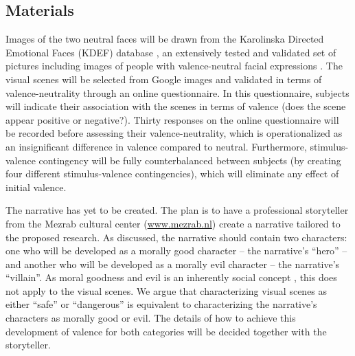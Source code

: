 \documentclass[12pt,a4paper]{article}\usepackage[]{graphicx}\usepackage[]{color}
\begin{document}
\subsection{Materials}
Images of the two neutral faces will be drawn from the Karolinska Directed Emotional Faces (KDEF) database \citep{KDEF}, an extensively tested and validated set of pictures including images of people with valence-neutral facial expressions \citep{goeleven2008}. The visual scenes will be selected from Google images and validated in terms of valence-neutrality through an online questionnaire. In this questionnaire, subjects will indicate their association with the scenes in terms of valence (does the scene appear positive or negative?). Thirty responses on the online questionnaire will be recorded before assessing their valence-neutrality, which is operationalized as an insignificant difference in valence compared to neutral. Furthermore, stimulus-valence contingency will be fully counterbalanced between subjects (by creating four different stimulus-valence contingencies), which will eliminate any effect of initial valence.

The narrative has yet to be created. The plan is to have a professional storyteller from the Mezrab cultural center (\url{www.mezrab.nl}) create a narrative tailored to the proposed research. As discussed, the narrative should contain two characters: one who will be developed as a morally good character -- the narrative's ``hero'' -- and another who will be developed as a morally evil character -- the narrative's ``villain''. As moral goodness and evil is an inherently social concept \citep{greene2002}, this does not apply to the visual scenes. We argue that characterizing visual scenes as either ``safe'' or ``dangerous'' is equivalent to characterizing the narrative's characters as morally good or evil. The details of how to achieve this development of valence for both categories will be decided together with the storyteller. 
\end{document}
